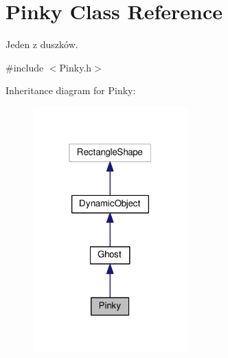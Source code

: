 \hypertarget{classPinky}{}\section{Pinky Class Reference}
\label{classPinky}


Jeden z duszków.  




{\ttfamily \#include $<$Pinky.\+h$>$}



Inheritance diagram for Pinky\+:\nopagebreak
\begin{figure}[H]
\begin{center}
\leavevmode
\includegraphics[width=169pt]{classPinky__inherit__graph}
\end{center}
\end{figure}


